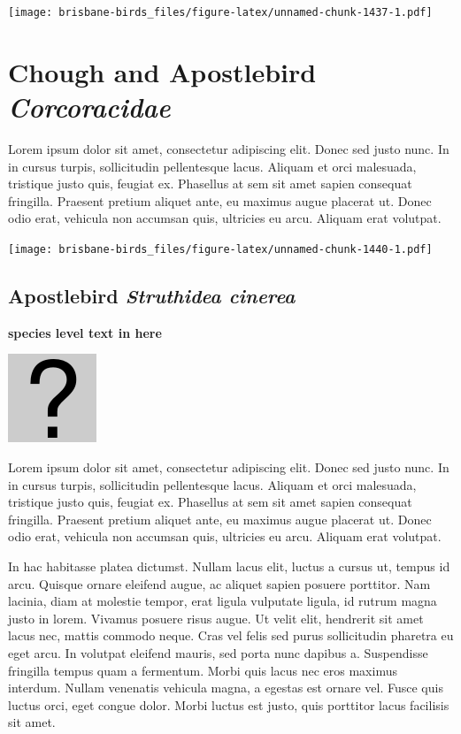 \documentclass[]{book}
\let\origfigure\figure
\let\endorigfigure\endfigure
\renewenvironment{figure}[1][2] {
  \expandafter\origfigure\expandafter[H]
} {
  \endorigfigure
}
\begin{document}
\begin{figure}
\centering
\texttt{[image: brisbane-birds\_files/figure-latex/unnamed-chunk-1437-1.pdf]}
\caption{\label{fig:unnamed-chunk-1437}insert figure caption}
\end{figure}

\chapter{\texorpdfstring{Chough and Apostlebird
\emph{Corcoracidae}}{Chough and Apostlebird Corcoracidae}}\label{chough-and-apostlebird-corcoracidae}

Lorem ipsum dolor sit amet, consectetur adipiscing elit. Donec sed justo
nunc. In in cursus turpis, sollicitudin pellentesque lacus. Aliquam et
orci malesuada, tristique justo quis, feugiat ex. Phasellus at sem sit
amet sapien consequat fringilla. Praesent pretium aliquet ante, eu
maximus augue placerat ut. Donec odio erat, vehicula non accumsan quis,
ultricies eu arcu. Aliquam erat volutpat.

\texttt{[image: brisbane-birds\_files/figure-latex/unnamed-chunk-1440-1.pdf]}

\section{\texorpdfstring{Apostlebird \emph{Struthidea
cinerea}}{Apostlebird Struthidea cinerea}}\label{apostlebird-struthidea-cinerea}

\textbf{species level text in here}

\begin{figure}
\centering
\includegraphics{assets/missing.png}
\caption{No image for species}
\end{figure}

Lorem ipsum dolor sit amet, consectetur adipiscing elit. Donec sed justo
nunc. In in cursus turpis, sollicitudin pellentesque lacus. Aliquam et
orci malesuada, tristique justo quis, feugiat ex. Phasellus at sem sit
amet sapien consequat fringilla. Praesent pretium aliquet ante, eu
maximus augue placerat ut. Donec odio erat, vehicula non accumsan quis,
ultricies eu arcu. Aliquam erat volutpat.

In hac habitasse platea dictumst. Nullam lacus elit, luctus a cursus ut,
tempus id arcu. Quisque ornare eleifend augue, ac aliquet sapien posuere
porttitor. Nam lacinia, diam at molestie tempor, erat ligula vulputate
ligula, id rutrum magna justo in lorem. Vivamus posuere risus augue. Ut
velit elit, hendrerit sit amet lacus nec, mattis commodo neque. Cras vel
felis sed purus sollicitudin pharetra eu eget arcu. In volutpat eleifend
mauris, sed porta nunc dapibus a. Suspendisse fringilla tempus quam a
fermentum. Morbi quis lacus nec eros maximus interdum. Nullam venenatis
vehicula magna, a egestas est ornare vel. Fusce quis luctus orci, eget
congue dolor. Morbi luctus est justo, quis porttitor lacus facilisis sit
amet.
\end{document}
